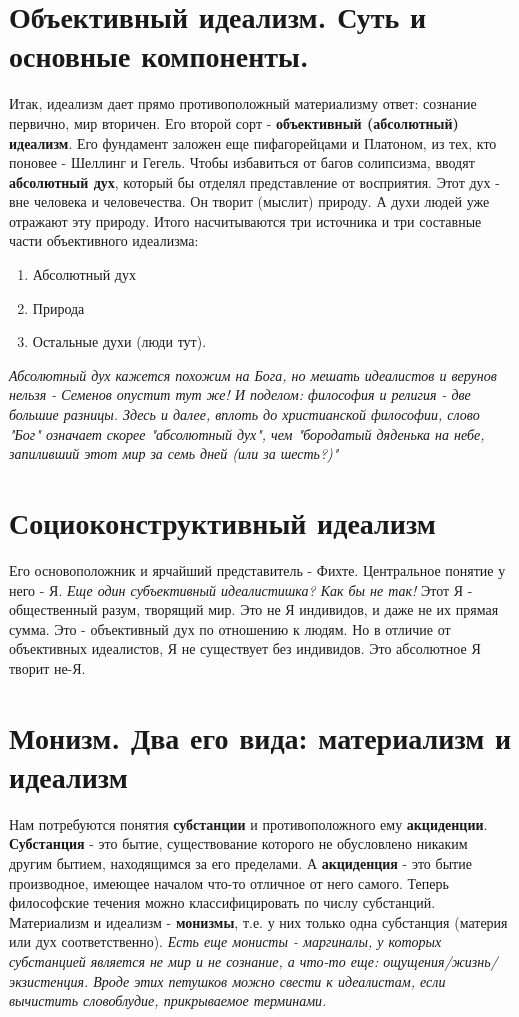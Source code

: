 \documentclass[12pt,a4paper]{article}
\begin{document}
\section{Объективный идеализм. Суть и основные компоненты.}
Итак, идеализм дает прямо противоположный материализму ответ: сознание первично, мир вторичен. Его второй сорт - \textbf{объективный (абсолютный) идеализм}. Его фундамент заложен еще пифагорейцами и Платоном, из тех, кто поновее - Шеллинг и Гегель. Чтобы избавиться от багов солипсизма, вводят \textbf{абсолютный дух}, который бы отделял представление от восприятия. Этот дух - вне человека и человечества. Он творит (мыслит) природу. А духи людей уже отражают эту природу. Итого насчитываются три источника и три составные части объективного идеализма:
\begin{enumerate}
\item Абсолютный дух
\item Природа
\item Остальные духи (люди тут).
\end{enumerate}
\textit{Абсолютный дух кажется похожим на Бога, но мешать идеалистов и верунов нельзя - Семенов опустит тут же! И поделом: философия и религия - две большие разницы. Здесь и далее, вплоть до христианской философии, слово "Бог" означает скорее "абсолютный дух", чем "бородатый дяденька на небе, запиливший этот мир за семь дней (или за шесть?)"}

\section{Социоконструктивный идеализм}
Его основоположник и ярчайший представитель - Фихте. Центральное понятие у него - Я. \textit{Еще один субъективный идеалистишка? Как бы не так!} Этот Я - общественный разум, творящий мир. Это не Я индивидов, и даже не их прямая сумма. Это - объективный дух по отношению к людям. Но в отличие от объективных идеалистов, Я не существует без индивидов. Это абсолютное Я творит не-Я.

\section{Монизм. Два его вида: материализм и идеализм}
Нам потребуются понятия \textbf{субстанции} и противоположного ему \textbf{акциденции}. 
\textbf{Субстанция} - это бытие, существование которого не обусловлено никаким другим бытием,
находящимся за его пределами.
А \textbf{акциденция} - это бытие производное, имеющее началом
что-то отличное от него самого. Теперь философские течения можно классифицировать по числу субстанций. Материализм и идеализм - \textbf{монизмы}, т.е. у них только одна субстанция (материя или дух соответственно). \textit{Есть еще монисты - маргиналы, у которых субстанцией является не мир и не сознание, а что-то еще: ощущения/жизнь/экзистенция. Вроде этих петушков можно свести к идеалистам, если вычистить словоблудие, прикрываемое терминами.}
\end{document}
